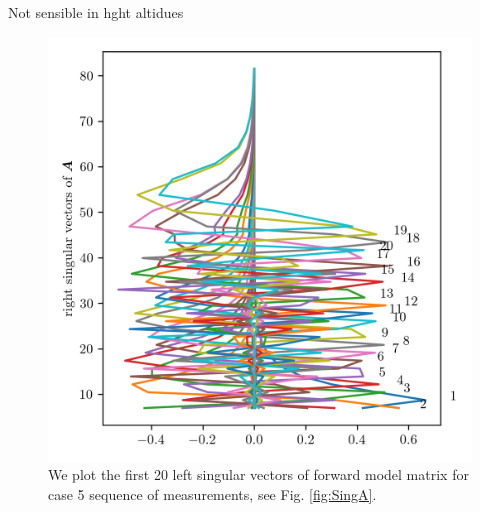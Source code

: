 Not sensible in hght altidues
\begin{figure}[ht!]
	\centering
	\includegraphics{SingVecA.png}
	\caption[Left singular vectors of forward model matrix for one sequence of measurements.]{We plot the first 20 left singular vectors of forward model matrix for case 5 sequence of measurements, see Fig. \ref{fig:SingA}.}
	\label{fig:SingVecA}
\end{figure}






